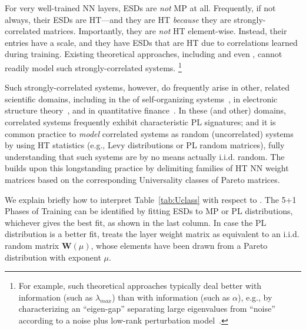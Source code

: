 For very well-trained NN layers, ESDs are \emph{not} MP at all.
Frequently, if not always, their ESDs are HT---and they are HT \emph{because} they are strongly-correlated matrices.  
Importantly, they are \emph{not} HT element-wise.
Instead, their entries have a scale, and they have ESDs that are HT due to correlations learned during training. 
Existing theoretical approaches, including \SLT and even \STATMECH, cannot readily model such strongly-correlated systems.%
\footnote{For example, such theoretical approaches typically deal better with \emph{\Scale} information (such as $\lambda_{max}$) than with 
\emph{\Shape} information (such as $\alpha$), e.g., by characterizing an ``eigen-gap'' separating large eigenvalues from 
``noise''~\cite{bach2006_JMLR} according to a noise plus low-rank perturbation model~\cite{BFR11}.}

Such strongly-correlated systems, however, do frequently arise in other, related scientific domains, including
in the \STATMECH of self-organizing systems~\cite{bak97a,SornetteBook}, 
in electronic structure theory~\cite{Martin1996HighlyAA,martin_reparametrizing_1998,martin1996redesigning}, and
in quantitative finance~\cite{bouchaud1999,bouchaud2005,potters_bouchaud_2020}. 
In these (and other) domains, correlated systems frequently exhibit characteristic PL signatures; and it is common practice to \emph{model} correlated systems as random (uncorrelated) systems by using HT statistics (e.g., Levy distributions or PL random matrices), fully understanding that such systems are by no means actually i.i.d. random.
The \HTSR \Phenomenology builds upon this longstanding practice by 
delimiting families of HT NN weight matrices based on the corresponding Universality classes of Pareto matrices. 

We explain briefly how to interpret Table~\ref{tab:Uclass} with respect to \HTRMT. The 5+1 Phases of Training can be 
identified by fitting ESDs to MP or PL distributions, whichever gives the best fit, as shown in the last column.
In case the PL distribution is a better fit, \HTSR \Phenomenology treats the layer weight matrix as 
equivalent to an i.i.d. random matrix $\mathbf{W}(\mu)$, whose elements have been drawn from a Pareto distribution 
with exponent $\mu$. 

